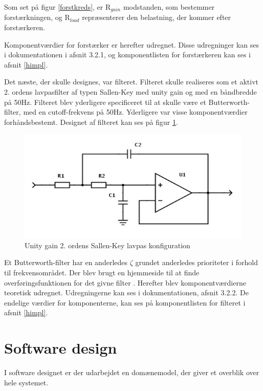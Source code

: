 Som set på figur \ref{forstkreds}, er R$_{gain}$ modstanden, som bestemmer forstærkningen, og R$_{load}$ repræsenterer den belastning, der kommer efter forstærkeren. 

Komponentværdier for forstærker er herefter udregnet. Disse udregninger kan ses i dokumentationen i afsnit 3.2.1, og komponentlisten for forstærkeren kan ses i afsnit \ref{himpl}. 

Det næste, der skulle designes, var filteret. Filteret skulle realiseres som et aktivt 2. ordens lavpasfilter af typen Sallen-Key med unity gain og med en båndbredde på 50Hz. Filteret blev yderligere specificeret til at skulle være et Butterworth-filter, med en cutoff-frekvens på 50Hz. Yderligere var visse komponentværdier forhåndsbestemt. Designet af filteret kan ses på figur \ref{fig:rFilter}.

\begin{figure}[H]
	\centering
	\includegraphics[width=1\textwidth]{Figurer/Hardware/FilterDesign}
	\caption{Unity gain 2. ordens Sallen-Key lavpas konfiguration}
	\label{fig:rFilter}
\end{figure}

Et Butterworth-filter har en anderledes $\zeta$ grundet anderledes prioriteter i forhold til frekvensområdet. Der blev brugt en hjemmeside til at finde overføringsfunktionen for det givne filter \cite{Overforing}. Herefter blev komponentværdierne teoretisk udregnet. Udregningerne kan ses i dokumentationen, afsnit 3.2.2. De endelige værdier for komponenterne, kan ses på komponentlisten for filteret i afsnit \ref{himpl}. 
   
   
\section{Software design}\label{Software arkitektur}
   I software designet er der udarbejdet en domænemodel, der giver et overblik over hele systemet.
   
